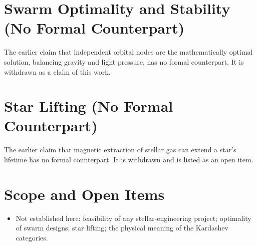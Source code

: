 \documentclass[11pt, a4paper]{article}
\begin{document}
\section{Swarm Optimality and Stability (No Formal Counterpart)}
The earlier claim that independent orbital nodes are the mathematically optimal solution, balancing gravity and light pressure, has no formal counterpart. It is withdrawn as a claim of this work.

\section{Star Lifting (No Formal Counterpart)}
The earlier claim that magnetic extraction of stellar gas can extend a star's lifetime has no formal counterpart. It is withdrawn and is listed as an open item.

\section{Scope and Open Items}
\begin{itemize}
  \item Not established here: feasibility of any stellar-engineering project; optimality of swarm designs; star lifting; the physical meaning of the Kardashev categories.
\end{itemize}
\end{document}
